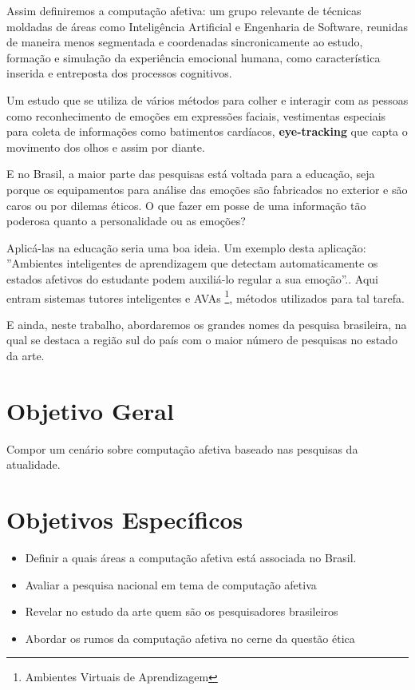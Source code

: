 \documentclass[
	12pt,				    %
	openright,			    %
	oneside,			    %
	a4paper,			    %
    sumario=tradicional,    %
	english,			    %
	brazil,				    %
	]{abntex2}              %
\begin{document}
Assim definiremos a computação afetiva: um grupo relevante de técnicas moldadas de áreas como Inteligência Artificial e Engenharia de Software, reunidas de maneira menos segmentada e coordenadas sincronicamente ao estudo, formação e simulação da experiência emocional humana, como característica inserida e entreposta dos processos cognitivos.\cite{pontarolo2003diferentes} 

Um estudo que se utiliza de vários métodos para colher e interagir com as pessoas como reconhecimento de emoções em expressões faciais, vestimentas especiais para coleta de informações como batimentos cardíacos, \textbf{eye-tracking} que capta o movimento dos olhos e assim por diante.

E no Brasil, a maior parte das pesquisas está voltada para a educação, seja porque os equipamentos para análise das emoções são fabricados no exterior e são caros ou por dilemas éticos. O que fazer em posse de uma informação tão poderosa quanto a personalidade ou as emoções?

Aplicá-las na educação seria uma boa ideia. Um exemplo desta aplicação: ''Ambientes inteligentes de aprendizagem que detectam automaticamente os estados afetivos do estudante podem auxiliá-lo regular a sua emoção''.\cite{jaques2012computaccao}. Aqui entram sistemas tutores inteligentes e AVAs \footnote{Ambientes Virtuais de Aprendizagem}, métodos utilizados para tal tarefa.

E ainda, neste trabalho, abordaremos os grandes nomes da pesquisa brasileira, na qual se destaca a região sul do país com o maior número de pesquisas no estado da arte.

\section{Objetivo Geral}
Compor um cenário sobre computação afetiva baseado nas pesquisas da atualidade.

\section{Objetivos Específicos}
\begin{itemize}
  \item Definir a quais áreas a computação afetiva está associada no Brasil.
  \item Avaliar a pesquisa nacional em tema de computação afetiva
  \item Revelar no estudo da arte quem são os pesquisadores brasileiros
  \item Abordar os rumos da computação afetiva no cerne da questão ética
  
\end{itemize}  
\end{document}

